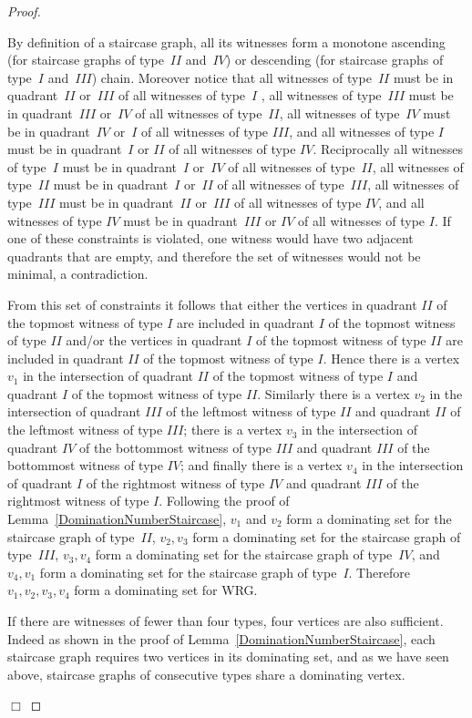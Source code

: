 \documentclass{llncs}
\begin{document}
\begin{proof}
\begin{enumerate}[i)]
By definition of a staircase graph, all its witnesses form a monotone ascending (for staircase graphs of type~$II$ and~$IV$) or descending (for staircase graphs of type~$I$ and~$III$) chain.
Moreover notice that all witnesses of type~$II$ must be in quadrant~$II$ or~$III$ of all witnesses of type~$I$ , all witnesses of type~$III$ must be in quadrant~$III$ or~$IV$ of all witnesses of type~$II$, all witnesses of type~$IV$ must be in quadrant~$IV$ or~$I$ of all witnesses of type $III$, and all witnesses of type $I$ must be in quadrant~$I$ or $II$ of all witnesses of type $IV$.
Reciprocally all witnesses of type~$I$ must be in quadrant~$I$ or~$IV$ of all witnesses of type~$II$, all witnesses of type~$II$ must be in quadrant~$I$ or~$II$ of all witnesses of type~$III$, all witnesses of type~$III$ must be in quadrant~$II$ or~$III$ of all witnesses of type $IV$, and all witnesses of type $IV$ must be in quadrant~$III$ or $IV$ of all witnesses of type $I$.
If one of these constraints is violated, one witness would have two adjacent quadrants that are empty, and therefore the set of witnesses would not be minimal, a contradiction.

From this set of constraints it follows that either the vertices in quadrant $II$ of the topmost witness of type $I$ are included in quadrant $I$ of the topmost witness of type $II$ and/or the vertices in quadrant $I$ of the topmost witness of type $II$ are included in quadrant $II$ of the topmost witness of type $I$. Hence there is a vertex $v_1$ in the intersection of quadrant $II$ of the topmost witness of type $I$ and quadrant $I$ of the topmost witness of type $II$. Similarly there is a vertex $v_2$ in the intersection of quadrant $III$ of the leftmost witness of type $II$ and quadrant $II$ of the leftmost witness of type $III$; there is a vertex $v_3$ in the intersection of quadrant $IV$ of the bottommost witness of type $III$ and quadrant $III$ of the bottommost witness of type $IV$; and finally there is a vertex $v_4$ in the intersection of quadrant $I$ of the rightmost witness of type $IV$ and quadrant $III$ of the rightmost witness of type $I$. Following the proof of Lemma~\ref{DominationNumberStaircase}, $v_1$ and $v_2$ form a dominating set for the staircase graph of type~$II$, $v_2, v_3$ form a dominating set for the staircase graph of type~$III$, $v_3, v_4$ form a dominating set for the staircase graph of type~$IV$, and $v_4, v_1$ form a dominating set for the staircase graph of type~$I$.
Therefore $v_1,v_2,v_3,v_4$ form a dominating set for WRG.

If there are witnesses of fewer than four types, four vertices are also sufficient.
Indeed as shown in the proof of Lemma~\ref{DominationNumberStaircase}, each staircase graph requires two vertices in its dominating set, and as we have seen above, staircase graphs of consecutive types share a dominating vertex.
\end{enumerate}
 \hspace*{0pt} \hfill $\Box$
\end{proof}
\end{document}
